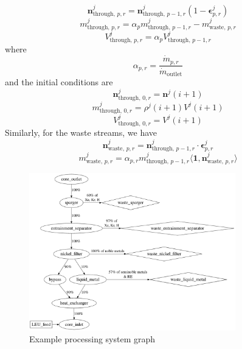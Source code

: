 \begin{equation}
    \mathbf{n}^{j}_{\text{through, }p,r} = \mathbf{n}^{j}_{\text{through, }p-1,r} (1 - \pmb{\epsilon}^{j}_{p,r})
\end{equation}
\begin{equation}
    m^{j}_{\text{through, } p,r} = \alpha_{p} m^{j}_{\text{through, }p-1,r} - m^{j}_{\text{waste, }p,r}
\end{equation}
\begin{equation}
    V^{j}_{\text{through, }p,r} = \alpha_{p}V^{j}_{\text{through, }p-1,r}
\end{equation}
where 
\begin{equation}
    \alpha_{p,r} = \frac{\dot{m}_{p,r}}{\dot{m}_{\text{outlet}}}
\end{equation}
and the initial conditions are 
\begin{equation}
    \mathbf{n}^{j}_{\text{through, }0,r} = \mathbf{n}^{j}(i+1)
\end{equation}
\begin{equation}
    m^{j}_{\text{through, }0,r} = \rho^{j}(i+1)V^{j}(i+1)
\end{equation}
\begin{equation}
    V^{j}_{\text{through, }0,r} = V^{j}(i+1)
\end{equation}
Similarly, for the waste streams, we have
\begin{equation}
    \mathbf{n}^{j}_{\text{waste, }p,r} = \mathbf{n}^{j}_{\text{through, }p-1,r} \cdot \pmb{\epsilon}^{j}_{p,r}
\end{equation}
\begin{equation}
    m^{j}_{\text{waste, }p,r} = \alpha_{p,r} m^{j}_{\text{through, }p-1,r} \langle\mathbf{1},\mathbf{n}^{j}_{\text{waste, }p,r}\rangle
\end{equation}

\begin{figure}[htpb]
    \centering
    \includegraphics[width=0.8\textwidth]{figs/ch3/example_process_graph}
    \caption{Example processing system graph}
    \label{fig:example-graph}
\end{figure}


